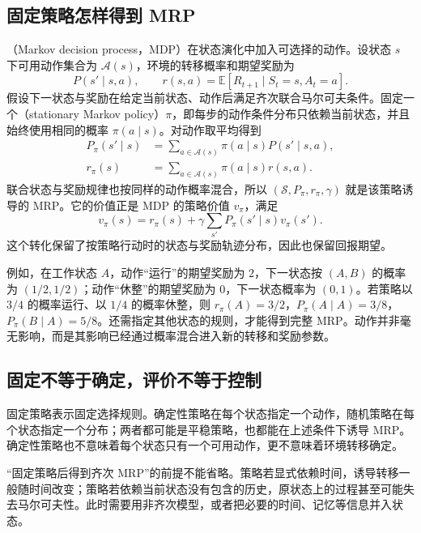 \documentclass[UTF8]{ctexart}
\begin{document}
\subsection{固定策略怎样得到 MRP}

（Markov decision process，MDP）在状态演化中加入可选择的动作。设状态 $s$ 下可用动作集合为 $\mathcal A(s)$，环境的转移概率和期望奖励为
\[
  P(s'\mid s,a),\qquad
  r(s,a)=\mathbb E[R_{t+1}\mid S_t=s,A_t=a].
\]
假设下一状态与奖励在给定当前状态、动作后满足齐次联合马尔可夫条件。固定一个（stationary Markov policy）$\pi$，即每步的动作条件分布只依赖当前状态，并且始终使用相同的概率 $\pi(a\mid s)$。对动作取平均得到
\begin{equation}
  \begin{aligned}
    P_\pi(s'\mid s)&=\sum_{a\in\mathcal A(s)}\pi(a\mid s)P(s'\mid s,a),\\
    r_\pi(s)&=\sum_{a\in\mathcal A(s)}\pi(a\mid s)r(s,a).
  \end{aligned}
  \label{eq:mrp-policy-induced}
\end{equation}
联合状态与奖励规律也按同样的动作概率混合，所以 $(\mathcal S,P_\pi,r_\pi,\gamma)$ 就是该策略诱导的 MRP。它的价值正是 MDP 的策略价值 $v_\pi$，满足
\begin{equation}
  v_\pi(s)=r_\pi(s)+\gamma\sum_{s'}P_\pi(s'\mid s)v_\pi(s').
  \label{eq:mrp-policy-value}
\end{equation}
这个转化保留了按策略行动时的状态与奖励轨迹分布，因此也保留回报期望。

例如，在工作状态 $A$，动作“运行”的期望奖励为 $2$，下一状态按 $(A,B)$ 的概率为 $(1/2,1/2)$；动作“休整”的期望奖励为 $0$，下一状态概率为 $(0,1)$。若策略以 $3/4$ 的概率运行、以 $1/4$ 的概率休整，则 $r_\pi(A)=3/2$，$P_\pi(A\mid A)=3/8$，$P_\pi(B\mid A)=5/8$。还需指定其他状态的规则，才能得到完整 MRP。动作并非毫无影响，而是其影响已经通过概率混合进入新的转移和奖励参数。

\subsection{固定不等于确定，评价不等于控制}

固定策略表示固定选择规则。确定性策略在每个状态指定一个动作，随机策略在每个状态指定一个分布；两者都可能是平稳策略，也都能在上述条件下诱导 MRP。确定性策略也不意味着每个状态只有一个可用动作，更不意味着环境转移确定。

“固定策略后得到齐次 MRP”的前提不能省略。策略若显式依赖时间，诱导转移一般随时间改变；策略若依赖当前状态没有包含的历史，原状态上的过程甚至可能失去马尔可夫性。此时需要用非齐次模型，或者把必要的时间、记忆等信息并入状态。
\end{document}
